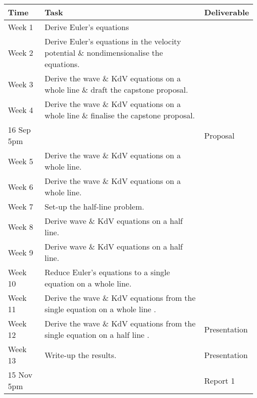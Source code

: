 \documentclass[10pt, oneside, a4paper]{article}
\begin{document}
\begin{center}
    \begin{tabular}{|l|l|l|} 
        \hline
        Time & Task & Deliverable\\
        \hline
        Week 1 & Derive Euler's equations & \\ 
        \hline
        Week 2 & Derive Euler's equations in the velocity potential \& nondimensionalise the equations. & \\ 
        \hline
        Week 3 & Derive the wave \& KdV equations on a whole line \& draft the capstone proposal.&\\
        \hline
        Week 4 & Derive the wave \& KdV equations on a whole line \& finalise the capstone proposal. &\\
        \hline 
        16 Sep 5pm & & Proposal\\
        \hline
        Week 5 & Derive the wave \& KdV equations on a whole line. &\\
        \hline
        Week 6 & Derive the wave \& KdV equations on a whole line. &\\
        \hline
        Week 7 & Set-up the half-line problem. &\\
        \hline
        Week 8 & Derive wave \& KdV equations on a half line. &\\
        \hline
        Week 9 & Derive wave \& KdV equations on a half line.  &\\
        \hline
        Week 10 & Reduce Euler's equations to a single equation on a whole line.&\\
        \hline
        Week 11 & Derive the wave \& KdV equations from the single equation on a whole line .&\\
        \hline
        Week 12 & Derive the wave \& KdV equations from the single equation on a half line .& Presentation\\
        \hline
        Week 13 & Write-up the results.& Presentation\\
        \hline
        15 Nov 5pm & & Report 1\\
        \hline
    \end{tabular}
 
\end{center}
\end{document}

